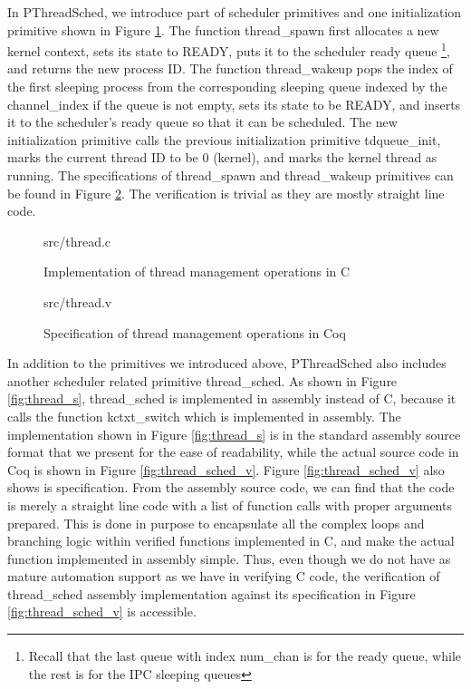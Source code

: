 In PThreadSched, we introduce part of scheduler primitives and one initialization primitive shown in
Figure \ref{fig:thread_c}. The function \textsf{thread\_spawn} first allocates a new kernel context,
sets its state to \textsf{READY}, puts it to the scheduler ready queue \footnote{Recall that
the last queue with index \textsf{num\_chan} is for the ready queue, while the rest is for the
IPC sleeping queues}, and returns the new process ID.
The function \textsf{thread\_wakeup} pops the index of the first sleeping process from the corresponding
sleeping queue indexed by the \textsf{channel\_index} if the queue is not empty, sets its state to be \textsf{READY},
and inserts it to the scheduler's ready queue so that it can be scheduled.
The new initialization primitive calls the previous initialization primitive \textsf{tdqueue\_init}, marks
the current thread ID to be 0 (kernel), and marks the kernel thread as running.
The specifications of \textsf{thread\_spawn} and \textsf{thread\_wakeup} primitives can be found
in Figure \ref{fig:thread_v}. The verification is trivial as they are mostly straight line code.

\begin{figure}
	 {src/thread.c}
	\caption{Implementation of thread management operations in C}
	\label{fig:thread_c}
\end{figure}

\begin{figure}
	 {src/thread.v}
	\caption{Specification of thread management operations in Coq}
	\label{fig:thread_v}
\end{figure}

In addition to the primitives we introduced above, PThreadSched also includes another
scheduler related primitive \textsf{thread\_sched}.
As shown in Figure \ref{fig:thread_s}, \textsf{thread\_sched} is implemented in
assembly instead of C, because it calls the function \textsf{kctxt\_switch} which
is implemented in assembly. The implementation shown in Figure \ref{fig:thread_s}
is in the standard assembly source format that we present for the ease of readability,
while the actual source code in Coq is shown in Figure \ref{fig:thread_sched_v}.
Figure \ref{fig:thread_sched_v} also shows is specification.
From the assembly source code, we can find that the code is merely a straight line
code with a list of function calls with proper arguments prepared. This is done in purpose to
encapsulate all the complex loops and branching logic within verified functions implemented in C,
and make the actual function implemented in assembly simple. Thus, even though we do not
have as mature automation support as we have in verifying C code, the verification of \textsf{thread\_sched}
assembly implementation against its specification in Figure \ref{fig:thread_sched_v} is accessible.


